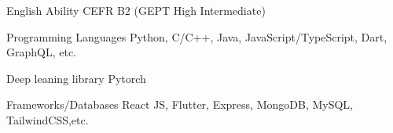 
\begin{cvskills}
  \cvskill
    {English Ability} %
    {CEFR B2 (GEPT High Intermediate)} %
    
  \cvskill
    {Programming Languages} %
    {Python, C/C++, Java, JavaScript/TypeScript, Dart, GraphQL, etc.} %
    
  \cvskill
    {Deep leaning library} %
    {Pytorch} %
    
  \cvskill
    {Frameworks/Databases} %
    {React JS, Flutter, Express, MongoDB, MySQL, TailwindCSS,etc.} %

\end{cvskills}
